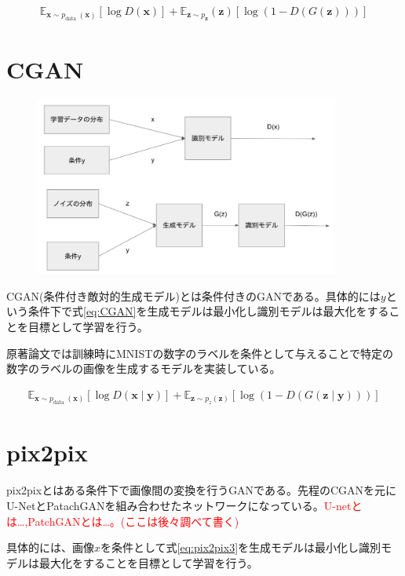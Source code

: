 \begin{align}
\label{eq:GAN}
    \mathbb{E}_{\boldsymbol{x} \sim p_{\text {data }}(\boldsymbol{x})}[\log D(\boldsymbol{x})]+\mathbb{E}_{\boldsymbol{z} \sim p_{\boldsymbol{z}}}(\boldsymbol{z})[\log (1-D(G(\boldsymbol{z})))]
\end{align}

\section{CGAN}

\begin{figure}[h]
    \includegraphics[width=10.0cm]{figure/CGAN.png}
\end{figure}

CGAN(条件付き敵対的生成モデル)とは条件付きのGANである。具体的には$y$という条件下で式\ref{eq:CGAN}を生成モデルは最小化し識別モデルは最大化をすることを目標として学習を行う\cite{CGAN}。\par
原著論文では訓練時にMNISTの数字のラベルを条件として与えることで特定の数字のラベルの画像を生成するモデルを実装している。


\begin{align}
    \label{eq:CGAN}
    \mathbb{E}_{\boldsymbol{x} \sim p_{\text {data }}(\boldsymbol{x})}[\log D(\boldsymbol{x} \mid \boldsymbol{y})]+\mathbb{E}_{\boldsymbol{z} \sim p_{z}(\boldsymbol{z})}[\log (1-D(G(\boldsymbol{z} \mid \boldsymbol{y})))]
\end{align}


\section{pix2pix}

pix2pixとはある条件下で画像間の変換を行うGANである。先程のCGANを元にU-NetとPatachGANを組み合わせたネットワークになっている。\textcolor{red}{U-netとは…,PatchGANとは…。(ここは後々調べて書く)}\par
具体的には、画像$x$を条件として式\ref{eq:pix2pix3}を生成モデルは最小化し識別モデルは最大化をすることを目標として学習を行う\cite{pix2pix}。

